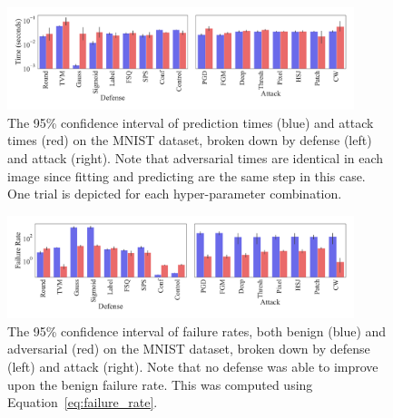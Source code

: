 \documentclass[journal]{IEEEtran}
\begin{document}
\begin{figure}[!hptb]
    {\centering
    \includegraphics[trim={0 0.85em 0 0.35em},clip,width=0.9\textwidth]{images/mnist/pred_time_plot.pdf}
    \vspace{-1em}
    \caption{The 95\% confidence interval of prediction times (blue) and attack times (red) on the MNIST dataset, broken down by defense (left) and attack (right). Note that adversarial times are identical in each image since fitting and predicting are the same step in this case. One trial is depicted for each hyper-parameter combination.}
    \label{fig:mnist_time}
    } %
\end{figure}

\begin{figure}[!hptb]
    {\centering
    \includegraphics[trim={0 0.85em 0 0.35em},clip,width=0.9\textwidth]{images/mnist/failure_rate_plot.pdf}
    \vspace{-1em}
    \caption{The 95\% confidence interval of failure rates, both benign (blue) and adversarial (red) on the MNIST dataset, broken down by defense (left) and attack (right). Note that no defense was able to improve upon the benign failure rate. This was computed using Equation~\ref{eq:failure_rate}.}
    \label{fig:mnist_failure_rate}
    } %
\end{figure}
\end{document}
